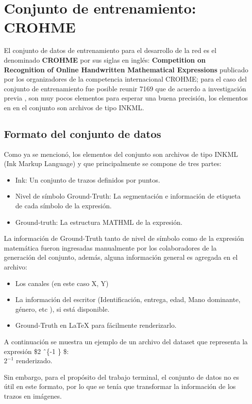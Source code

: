 \newpage
\section{Conjunto de entrenamiento: CROHME}

El conjunto de datos de entrenamiento para el desarrollo de la red es el denominado \textbf{CROHME} por sus siglas en inglés: \textbf{Competition on Recognition of Online Handwritten Mathematical Expressions} publicado por los organizadores de la competencia internacional CROHME; para el caso del conjunto de entrenamiento fue posible reunir 7169 que de acuerdo a investigación previa \cite{chino}, son muy pocos elementos  para esperar una buena precisión, los  elementos en en el conjunto son archivos de tipo INKML.
\subsection{Formato del conjunto de datos}

Como ya se mencionó, los elementos del conjunto son archivos de tipo INKML (Ink Markup Language) y que principalmente se compone de tres partes:

\begin{itemize}
	\item Ink: Un conjunto de trazos definidos por puntos.
	\item Nivel de símbolo Ground-Truth: La segmentación e información de etiqueta de cada símbolo de la expresión.
	\item Ground-truth: La estructura MATHML de la expresión.
\end{itemize}

La información de Ground-Truth tanto de nivel de símbolo como de la expresión matemática fueron ingresadas manualmente por los colaboradores de la generación del conjunto, además, alguna información general es agregada en el archivo:

\begin{itemize}
	\item Los canales (en este caso X, Y)
	\item La información del escritor (Identificación, entrega, edad, Mano dominante, género, etc ), si está disponible.
	\item Ground-Truth en \LaTeX{} para fácilmente renderizarlo.
\end{itemize}

A continuación se muestra un ejemplo de un archivo del dataset que representa la expresión \$2 \^\ \{-1 \} \$:\\
 $2^{-1}$ renderizado.

Sin embargo, para el propósito del trabajo terminal, el conjunto de datos no es útil en este formato, por lo que se tenía que transformar la información de los trazos en imágenes.
